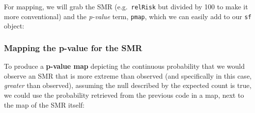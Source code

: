 \documentclass[
]{book}
\newenvironment{Shaded}{\begin{snugshade}}{\end{snugshade}}
\newcommand{\DecValTok}[1]{\textcolor[rgb]{0.00,0.00,0.81}{#1}}
\newcommand{\NormalTok}[1]{#1}
\newcommand{\OtherTok}[1]{\textcolor[rgb]{0.56,0.35,0.01}{#1}}
\newcommand{\SpecialCharTok}[1]{\textcolor[rgb]{0.81,0.36,0.00}{\textbf{#1}}}
\begin{document}
For mapping, we will grab the SMR (e.g.~\texttt{relRisk} but divided by 100 to make it more conventional) and the \emph{p-value} term, \texttt{pmap}, which we can easily add to our \texttt{sf} object:

\begin{Shaded}
\end{Shaded}

\hypertarget{mapping-the-p-value-for-the-smr}{%
\subsubsection{Mapping the p-value for the SMR}\label{mapping-the-p-value-for-the-smr}}

To produce a \textbf{p-value map} depicting the continuous probability that we would observe an SMR that is more extreme than observed (and specifically in this case, \emph{greater} than observed), assuming the null described by the expected count is true, we could use the probability retrieved from the previous code in a map, next to the map of the SMR itself:
\end{document}
